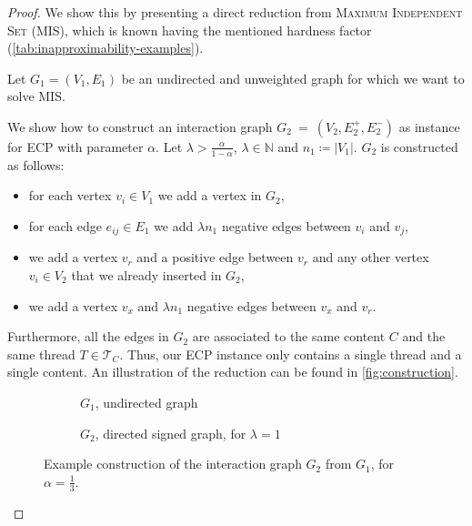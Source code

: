 \begin{proof}
	We show this by presenting a direct reduction from \textsc{Maximum
		Independent Set} (MIS), which is known having the mentioned hardness
	factor (\autoref{tab:inapproximability-examples}).

	\bigskip
	Let $G_{1}  = (V_{1} ,E_{1} )$ be an undirected and unweighted graph for
	which we want to solve MIS.

	We show how to construct an interaction graph \mbox{${G}_{2}~=~(V_{2} , E^{+}_{2} , E
				^{-}_{2} ) $} as instance for \acrshort{ECP} with parameter
	$\alpha $. Let $\lambda > \frac{\alpha }{1 - \alpha }$, $\lambda \in \mathbb{N} $ and $n_{1} \coloneqq |V_{1}| $.
	$G_2$ is constructed as follows:

	\begin{itemize}
		\item for each vertex $v_{i}  \in V_{1} $ we add a vertex in $G_{2} $,
		\item for each edge $e_{ij}  \in
			      E_{1} $ we add $\lambda n_{1} $ negative edges between $v_{i}
		      $ and $v_{j} $,
		\item we add a vertex $v_r$ and a positive edge between $v_r$ and any other
		      vertex $v_i \in V_2$ that we already inserted in $G_2$,
		\item we add a vertex $v_x$ and $\lambda n_{1} $ negative edges between $v_x$
		      and $v_{r} $.
	\end{itemize}

	Furthermore, all the edges in $G_{2} $ are associated to the same content
	$C$ and the same thread $T \in \mathcal{T}_{C}  $.
	Thus, our \acrshort{ECP} instance only contains a single thread and a
	single content.  An illustration of the reduction can be found in \autoref{fig:construction}.

	\begin{figure}
		\begin{center}
			\begin{subfigure}{0.4\textwidth}
				\centering
				\vspace{10pt}
				\caption{$G_{1}$, undirected graph}
				\label{fig:g1_example}
			\end{subfigure}
			\begin{subfigure}{0.4\textwidth}
				\centering
				\caption{$G_{2}$, directed signed graph, for $\lambda = 1$}
				\label{fig:g2_example}
			\end{subfigure}
		\end{center}
		\caption[Example reduction from MIS to \acrshort{ECP}]{Example construction of the interaction graph $G_{2} $ from
			$G_{1} $, for $\alpha = \frac{1}{3} $.}
		\label{fig:construction}
	\end{figure}


\end{proof}
